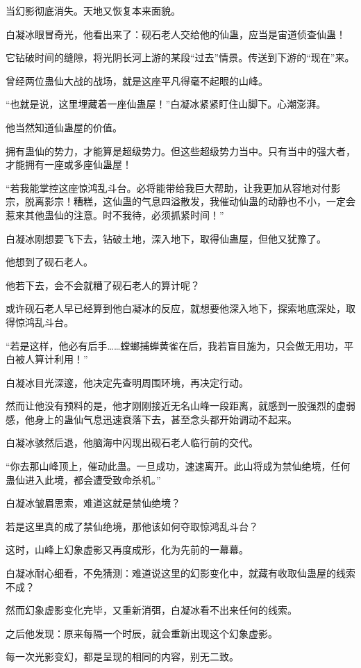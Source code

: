\begin{this_body}
当幻影彻底消失。天地又恢复本来面貌。

白凝冰眼冒奇光，他看出来了：砚石老人交给他的仙蛊，应当是宙道侦查仙蛊！

它钻破时间的缝隙，将光阴长河上游的某段“过去”情景。传送到下游的“现在”来。

曾经两位蛊仙大战的战场，就是这座平凡得毫不起眼的山峰。

“也就是说，这里埋藏着一座仙蛊屋！”白凝冰紧紧盯住山脚下。心潮澎湃。

他当然知道仙蛊屋的价值。

拥有蛊仙的势力，才能算是超级势力。但这些超级势力当中。只有当中的强大者，才能拥有一座或多座仙蛊屋！

“若我能掌控这座惊鸿乱斗台。必将能带给我巨大帮助，让我更加从容地对付影宗，脱离影宗！糟糕，这仙蛊的气息四溢散发，我催动仙蛊的动静也不小，一定会惹来其他蛊仙的注意。时不我待，必须抓紧时间！”

白凝冰刚想要飞下去，钻破土地，深入地下，取得仙蛊屋，但他又犹豫了。

他想到了砚石老人。

他若下去，会不会就糟了砚石老人的算计呢？

或许砚石老人早已经算到他白凝冰的反应，就想要他深入地下，探索地底深处，取得惊鸿乱斗台。

“若是这样，他必有后手……螳螂捕蝉黄雀在后，我若盲目施为，只会做无用功，平白被人算计利用！”

白凝冰目光深邃，他决定先查明周围环境，再决定行动。

然而让他没有预料的是，他才刚刚接近无名山峰一段距离，就感到一股强烈的虚弱感，他身上的蛊仙气息迅速衰落下去，甚至念头都开始调动不起来。

白凝冰骇然后退，他脑海中闪现出砚石老人临行前的交代。

“你去那山峰顶上，催动此蛊。一旦成功，速速离开。此山将成为禁仙绝境，任何蛊仙进入此境，都会遭受致命杀机。”

白凝冰皱眉思索，难道这就是禁仙绝境？

若是这里真的成了禁仙绝境，那他该如何夺取惊鸿乱斗台？

这时，山峰上幻象虚影又再度成形，化为先前的一幕幕。

白凝冰耐心细看，不免猜测：难道说这里的幻影变化中，就藏有收取仙蛊屋的线索不成？

然而幻象虚影变化完毕，又重新消弭，白凝冰看不出来任何的线索。

之后他发现：原来每隔一个时辰，就会重新出现这个幻象虚影。

每一次光影变幻，都是呈现的相同的内容，别无二致。


\end{this_body}
